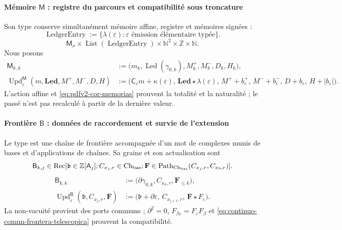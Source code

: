 \paragraph{Mémoire \(\mathsf M\) : registre du parcours et compatibilité sous troncature}
Son type conserve simultanément mémoire affine, registre et mémoires signées :
\begin{equation}
\label{eq:pdfv2-terminal-tipo-ledger-entry}
 \operatorname{LedgerEntry}:=
 \{\lambda(\varepsilon):\varepsilon\text{ émission élémentaire typée}\}.
\end{equation}
\[
 \mathsf M_x\times\operatorname{List}(\operatorname{LedgerEntry})
 \times\mathbb N^2\times\mathbb Z\times\mathbb N.
\]
Nous posons
\begin{align}
 \mathsf M_{k,k}&:=
 \bigl(m_k,\operatorname{Led}(\gamma_{0,k}),
       M_k^+,M_k^-,D_k,H_k\bigr),
 \label{eq:pdfv2-terminal-semilla-m}\\
 \operatorname{Upd}^{\mathsf M}_{\varepsilon}
 (m,\mathbf{Led},M^+,M^-,D,H)
 &:=
 \bigl(\mathsf C_\varepsilon m+\kappa(\varepsilon),\,
 \mathbf{Led}\star\lambda(\varepsilon),\,
 M^++b_\varepsilon^+,\,M^-+b_\varepsilon^-,\,
 D+b_\varepsilon,\,H+|b_\varepsilon|\bigr).
 \label{eq:pdfv2-terminal-update-m}
\end{align}
L'action affine et \eqref{eq:pdfv2-cor-memorias} prouvent la totalité et la naturalité ; le passé n'est pas recalculé à partir de la dernière valeur.

\paragraph{Frontière \(\mathsf B\) : données de raccordement et survie de l'extension}
Le type est une chaîne de frontière accompagnée d'un mot de complexes munis de bases et d'applications de chaînes. Sa graine et son actualisation sont
\[
 \mathsf B_{k,j}\in
 \operatorname{Rec}[\mathfrak b\in\mathbb Z[\mathsf A_j];
 C_{x_j,r}\in\operatorname{Ch}_{\rm bas};
 \mathbf F\in\operatorname{Path}_{\operatorname{Ch}_{\rm bas}}
 (C_{x_j,r},C_{x_0,r})].
\]
\begin{align}
 \mathsf B_{k,k}&:=
 \bigl(\partial\gamma_{0,k},C_{x_k,r},\mathbf F_{\leq k}\bigr),
 \label{eq:pdfv2-terminal-semilla-b}\\
 \operatorname{Upd}^{\mathsf B}_{\varepsilon}
 (\mathfrak b,C_{x_j,r},\mathbf F)
 &:=
 \bigl(\mathfrak b+\partial\varepsilon,\,
 C_{x_{j+1},r},\,\mathbf F\star F_\varepsilon\bigr).
 \label{eq:pdfv2-terminal-update-b}
\end{align}
La non-vacuité provient des ports communs ; \(\partial^2=0\), \(F_{\beta\varepsilon}=F_\varepsilon F_\beta\) et \eqref{eq:continuo-comun-frontera-telescopica} prouvent la compatibilité.

